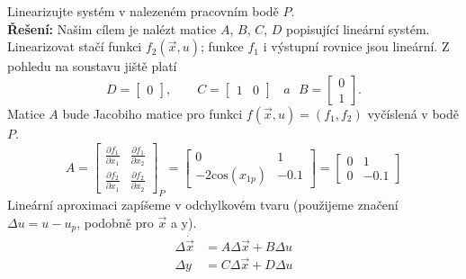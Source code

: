 \documentclass[twoside]{article}
\begin{document}
\subsection{~}
Linearizujte systém v nalezeném pracovním bodě $P$.\\
\textbf{Řešení:} Našim cílem je nalézt matice $A$, $B$, $C$, $D$ popisující lineární systém. Linearizovat stačí funkci $f_2(\vec{x}, u)$; funkce $f_1$ i výstupní
rovnice jsou lineární. Z pohledu na soustavu jiště platí
\begin{equation*}
	D = \begin{bmatrix}
		0
	\end{bmatrix}, ~~~~~~~~~ C = \begin{bmatrix}
		1 & 0
	\end{bmatrix} ~~~~a ~~~ B = \begin{bmatrix}
		0 \\ 1
	\end{bmatrix}.
\end{equation*}
Matice $A$ bude Jacobiho matice pro funkci $f(\vec{x}, u) = (f_1, f_2)$ vyčíslená v bodě $P$.
\begin{equation*}
	A = \begin{bmatrix}
		\frac{\partial f_1}{\partial x_1} & \frac{\partial f_1}{\partial x_2} \\ 
		\frac{\partial f_2}{\partial x_1} & \frac{\partial f_2}{\partial x_2}
	\end{bmatrix}_P = \begin{bmatrix}
		0 & 1 \\
		-2\text{cos}(x_{1p}) & -0.1
	\end{bmatrix} = \begin{bmatrix}
		0 & 1 \\
		0 & -0.1
	\end{bmatrix}
\end{equation*}
Lineární aproximaci zapíšeme v odchylkovém tvaru (použijeme značení $\Delta u = u - u_p$, podobně pro $\vec{x}$ a y).
\begin{equation*}
	\begin{split}
		\Delta \dot{\vec{x}} &= A \Delta\vec{x} + B \Delta u \\
		\Delta y &= C \Delta\vec{x} + D \Delta u
	\end{split}
\end{equation*}

\
\end{document}
